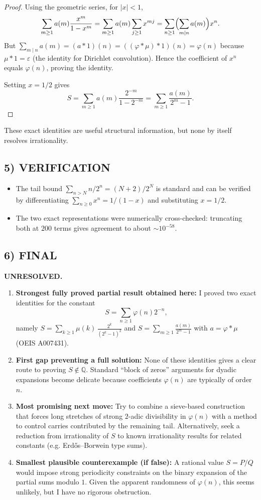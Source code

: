 \begin{proof}
Using the geometric series, for $|x|<1$,
\[
\sum_{m\ge 1} a(m)\frac{x^m}{1-x^m}
=\sum_{m\ge 1} a(m)\sum_{j\ge 1} x^{mj}
=\sum_{n\ge 1}\Bigl(\sum_{m\mid n} a(m)\Bigr)x^n.
\]
But $\sum_{m\mid n} a(m) = (a*1)(n) = ((\varphi*\mu)*1)(n)=\varphi(n)$ because $\mu*1=\varepsilon$ (the identity for Dirichlet convolution). Hence the coefficient of $x^n$ equals $\varphi(n)$, proving the identity.

Setting $x=1/2$ gives
\[
S=\sum_{m\ge 1} a(m)\frac{2^{-m}}{1-2^{-m}}=\sum_{m\ge 1}\frac{a(m)}{2^m-1}.
\]
\end{proof}

These exact identities are useful structural information, but none by itself resolves irrationality.

\subsection*{5) VERIFICATION}
\begin{itemize}[leftmargin=2em]
\item The tail bound $\sum_{n>N} n/2^n=(N+2)/2^N$ is standard and can be verified by differentiating $\sum_{n\ge 0} x^n=1/(1-x)$ and substituting $x=1/2$.
\item The two exact representations were numerically cross-checked: truncating both at $200$ terms gives agreement to about $\sim 10^{-58}$.
\end{itemize}

\subsection*{6) FINAL}
\textbf{UNRESOLVED.}
\begin{enumerate}[label=(\roman*),leftmargin=2.5em]
\item \textbf{Strongest fully proved partial result obtained here:} I proved two exact identities for the constant
\[S=\sum_{n\ge 1}\varphi(n)2^{-n},\]
namely $S=\sum_{k\ge 1}\mu(k)\,\frac{2^k}{(2^k-1)^2}$ and $S=\sum_{m\ge 1}\frac{a(m)}{2^m-1}$ with $a=\varphi*\mu$ (OEIS A007431).
\item \textbf{First gap preventing a full solution:} None of these identities gives a clear route to proving $S\notin\mathbb{Q}$. Standard ``block of zeros'' arguments for dyadic expansions become delicate because coefficients $\varphi(n)$ are typically of order $n$.
\item \textbf{Most promising next move:} Try to combine a sieve-based construction that forces long stretches of strong $2$-adic divisibility in $\varphi(n)$ with a method to control carries contributed by the remaining tail. Alternatively, seek a reduction from irrationality of $S$ to known irrationality results for related constants (e.g. Erd\H{o}s--Borwein type sums).
\item \textbf{Smallest plausible counterexample (if false):} A rational value $S=P/Q$ would impose strong periodicity constraints on the binary expansion of the partial sums modulo $1$. Given the apparent randomness of $\varphi(n)$, this seems unlikely, but I have no rigorous obstruction.
\end{enumerate}

